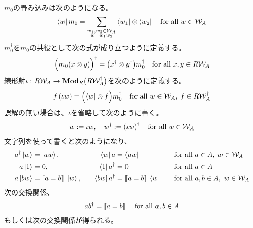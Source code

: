{\begin{equation*}
\begin{split}
	\end{split}\end{equation*}
	$m_0$の畳み込みは次のようになる。
	\begin{equation*}\begin{split}
		\mathinner{\langle{w}|}m_0 = \sum_{\substack{w_1,w_2\in{\ensuremath{{\mathcal{W}}}}_A\\ w=w_1w_2}}
			\mathinner{\langle{w_1}|}\otimes\mathinner{\langle{w_2}|} \quad\text{for all } w\in{\ensuremath{{\mathcal{W}}}}_A
	\end{split}\end{equation*}
	$m_0^\dag$を$m_0$の共役として次の式が成り立つように定義する。
	\begin{equation*}\begin{split}
		\Bigl({m_0(x\otimes y)}\Bigr)^\dag = \bigl({x^\dag\otimes y^\dag}\bigr) m_0^\dag 
		\quad\text{for all } x,y\in R{{\mathcal{W}}}_A
	\end{split}\end{equation*}
	線形射$\iota:R{{\mathcal{W}}}_A\to{\ensuremath{\mathbf{{Mod}}}}_R\bigl({R{{\mathcal{W}}}_A^\dag}\bigr)$を次のように定義する。
	\begin{equation*}\begin{split}
		f\left({\iota w}\right) = \Bigl({\mathinner{\langle{w}|}\otimes f}\Bigr) m_0^\dag
		\quad\text{for all } w\in {\ensuremath{{\mathcal{W}}}}_A,\; f\in R{{\mathcal{W}}}_A^\dag
	\end{split}\end{equation*}
	誤解の無い場合は、$\iota$を省略して次のように書く。
	\begin{equation*}\begin{split}
		w := \iota w,\quad w^\dag := \left({\iota w}\right)^\dag
		\quad\text{for all } w\in{\ensuremath{{\mathcal{W}}}}_A
	\end{split}\end{equation*}
	文字列を使って書くと次のようになり、
	\begin{alignat*}{4}
		a^\dag\mathinner{|{w}\rangle} &= \mathinner{|{aw}\rangle} ,&\quad \mathinner{\langle{w}|}a &= \mathinner{\langle{aw}|} 
			&\quad&\text{for all } a\in A,\; w\in{\ensuremath{{\mathcal{W}}}}_A \\
		a\mathinner{|{1}\rangle} &= 0 ,&\quad \mathinner{\langle{1}|}a^\dag &= 0
			&\quad&\text{for all } a\in A \\
		a\mathinner{|{bw}\rangle} &= [\![a=b]\!]\;\mathinner{|{w}\rangle} ,&\quad 
			\mathinner{\langle{bw}|}a^\dag &= [\![a=b]\!]\;\mathinner{\langle{w}|}
			&\quad&\text{for all } a,b\in A,\; w\in{\ensuremath{{\mathcal{W}}}}_A
	\end{alignat*}
	次の交換関係、
	\begin{equation*}\begin{split}
		ab^\dag = [\![a=b]\!]\; \quad\text{for all } a,b\in A
	\end{split}\end{equation*}
	もしくは次の交換関係が得られる。
	\begin{equation*}\begin{split}

\end{split}
\end{equation*}}
